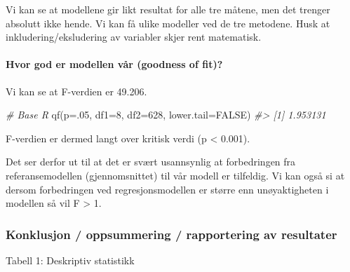 \documentclass[
]{article}
\newenvironment{Shaded}{\begin{snugshade}}{\end{snugshade}}
\newcommand{\AttributeTok}[1]{\textcolor[rgb]{0.77,0.63,0.00}{#1}}
\newcommand{\CommentTok}[1]{\textcolor[rgb]{0.56,0.35,0.01}{\textit{#1}}}
\newcommand{\ConstantTok}[1]{\textcolor[rgb]{0.00,0.00,0.00}{#1}}
\newcommand{\DecValTok}[1]{\textcolor[rgb]{0.00,0.00,0.81}{#1}}
\newcommand{\FunctionTok}[1]{\textcolor[rgb]{0.00,0.00,0.00}{#1}}
\newcommand{\NormalTok}[1]{#1}
\begin{document}
Vi kan se at modellene gir likt resultat for alle tre måtene, men det trenger absolutt ikke hende. Vi kan få ulike modeller ved de tre metodene. Husk at inkludering/eksludering av variabler skjer rent matematisk.

\hypertarget{hvor-god-er-modellen-vuxe5r-goodness-of-fit-3}{%
\paragraph{Hvor god er modellen vår (goodness of fit)?}\label{hvor-god-er-modellen-vuxe5r-goodness-of-fit-3}}

Vi kan se at F-verdien er 49.206.

\begin{Shaded}
\begin{Highlighting}[]
\CommentTok{\# Base R}
\FunctionTok{qf}\NormalTok{(}\AttributeTok{p=}\NormalTok{.}\DecValTok{05}\NormalTok{, }\AttributeTok{df1=}\DecValTok{8}\NormalTok{, }\AttributeTok{df2=}\DecValTok{628}\NormalTok{, }\AttributeTok{lower.tail=}\ConstantTok{FALSE}\NormalTok{)}
\CommentTok{\#\textgreater{} [1] 1.953131}
\end{Highlighting}
\end{Shaded}

F-verdien er dermed langt over kritisk verdi (p \textless{} 0.001).

Det ser derfor ut til at det er svært usannsynlig at forbedringen fra referansemodellen (gjennomsnittet) til vår modell er tilfeldig. Vi kan også si at dersom forbedringen ved regresjonsmodellen er større enn unøyaktigheten i modellen så vil F \textgreater{} 1.

\hypertarget{konklusjon-oppsummering-rapportering-av-resultater-2}{%
\subsubsection{Konklusjon / oppsummering / rapportering av resultater}\label{konklusjon-oppsummering-rapportering-av-resultater-2}}

Tabell 1: Deskriptiv statistikk
\end{document}
